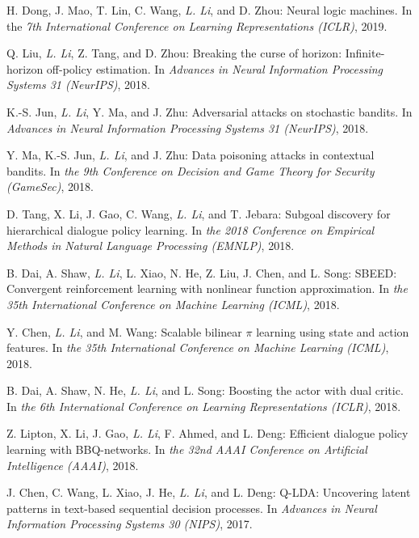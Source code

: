 \documentclass[10pt,twoside,letterpaper]{article}
\newcommand{\selffont}[1]{{\textit{#1}}}
\newcommand{\venuefont}[1]{{\textit{#1}}}
\newcommand{\myself}{\selffont{L. Li}}
\begin{document}
\begin{compactenum}[(C1)]
\item{H. Dong, J. Mao, T. Lin, C. Wang, \myself, and D. Zhou: Neural logic machines.  In the \venuefont{7th International Conference on Learning Representations (ICLR)}, 2019.}

\item{Q. Liu, \myself, Z. Tang, and D. Zhou: Breaking the curse of horizon: Infinite-horizon off-policy estimation.  In \venuefont{Advances in Neural Information Processing Systems 31 (NeurIPS)}, 2018.}

\item{K.-S. Jun, \myself, Y. Ma, and J. Zhu: Adversarial attacks on stochastic bandits.  In \venuefont{Advances in Neural Information Processing Systems 31 (NeurIPS)}, 2018.}

\item{Y. Ma, K.-S. Jun, \myself, and J. Zhu: Data poisoning attacks in contextual bandits. In \venuefont{the 9th Conference on Decision and Game Theory for Security (GameSec)}, 2018.}

\item{D. Tang, X. Li, J. Gao, C. Wang, \myself, and T. Jebara: Subgoal discovery for hierarchical dialogue policy learning. In \venuefont{the 2018 Conference on Empirical Methods in Natural Language Processing (EMNLP)}, 2018.}

\item{B. Dai, A. Shaw, \myself, L. Xiao, N. He, Z. Liu, J. Chen, and L. Song: SBEED: Convergent reinforcement learning with nonlinear function approximation.  In \venuefont{the 35th International Conference on Machine Learning (ICML)}, 2018.}

\item{Y. Chen, \myself, and M. Wang: Scalable bilinear $\pi$ learning using state and action features.  In \venuefont{the 35th International Conference on Machine Learning (ICML)}, 2018.}

\item{B. Dai, A. Shaw, N. He, \myself, and L. Song: Boosting the actor with dual critic. In \venuefont{the 6th International Conference on Learning Representations (ICLR)}, 2018.}

\item{Z. Lipton, X. Li, J. Gao, \myself, F. Ahmed, and L. Deng: Efficient dialogue policy learning with BBQ-networks.  In \venuefont{the 32nd AAAI Conference on Artificial Intelligence (AAAI)}, 2018.}

\item{J. Chen, C. Wang, L. Xiao, J. He, \myself, and L. Deng: Q-LDA: Uncovering latent patterns in text-based sequential decision processes. In \venuefont{Advances in Neural Information Processing Systems 30 (NIPS)}, 2017.}


\end{compactenum}
\end{document}
